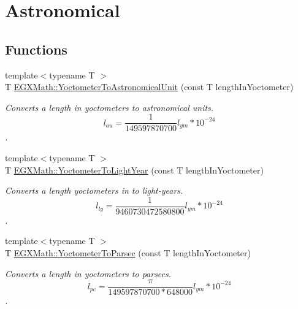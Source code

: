 \hypertarget{group___e_g_x_math-_conversions-_length_conversions-_s_i-_yoctometer-_astronomical}{}\section{Astronomical}
\label{group___e_g_x_math-_conversions-_length_conversions-_s_i-_yoctometer-_astronomical}
\subsection*{Functions}
\begin{DoxyCompactItemize}
\item 
{\footnotesize template$<$typename T $>$ }\\T \mbox{\hyperlink{group___e_g_x_math-_conversions-_length_conversions-_s_i-_yoctometer-_astronomical_ga6963327b8caa5f9a231197768126efc2}{E\+G\+X\+Math\+::\+Yoctometer\+To\+Astronomical\+Unit}} (const T length\+In\+Yoctometer)
\begin{DoxyCompactList}\small\item\em Converts a length in yoctometers to astronomical units. \[ l_{au}= \frac{1}{149597870700} l_{ym} * 10^{-24} \]. \end{DoxyCompactList}\item 
{\footnotesize template$<$typename T $>$ }\\T \mbox{\hyperlink{group___e_g_x_math-_conversions-_length_conversions-_s_i-_yoctometer-_astronomical_gab1406f246c0472c4cef3ee0f5a6b1221}{E\+G\+X\+Math\+::\+Yoctometer\+To\+Light\+Year}} (const T length\+In\+Yoctometer)
\begin{DoxyCompactList}\small\item\em Converts a length yoctometers in to light-\/years. \[ l_{ly}= \frac{1}{9460730472580800} l_{ym} * 10^{-24} \]. \end{DoxyCompactList}\item 
{\footnotesize template$<$typename T $>$ }\\T \mbox{\hyperlink{group___e_g_x_math-_conversions-_length_conversions-_s_i-_yoctometer-_astronomical_ga6856c1dd6b2d31388b4138dcb03bd8ce}{E\+G\+X\+Math\+::\+Yoctometer\+To\+Parsec}} (const T length\+In\+Yoctometer)
\begin{DoxyCompactList}\small\item\em Converts a length in yoctometers to parsecs. \[ l_{pc}=\frac{\pi}{149597870700 * 648000} l_{ym} * 10^{-24} \]. \end{DoxyCompactList}\end{DoxyCompactItemize}


